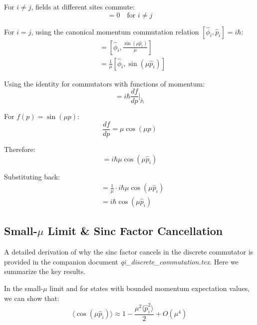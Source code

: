 \documentclass[12pt]{article}
\begin{document}
For $i \neq j$, fields at different sites commute:
\begin{equation}
[\hat{\phi}_i, \hat{\pi}_j^{\text{poly}}] = 0 \quad \text{for } i \neq j
\end{equation}

For $i = j$, using the canonical momentum commutation relation $[\hat{\phi}_i, \hat{p}_i] = i\hbar$:
\begin{align}
[\hat{\phi}_i, \hat{\pi}_i^{\text{poly}}] &= [\hat{\phi}_i, \frac{\sin(\mu \hat{p}_i)}{\mu}] \\
&= \frac{1}{\mu}[\hat{\phi}_i, \sin(\mu \hat{p}_i)]
\end{align}

Using the identity for commutators with functions of momentum:
\begin{equation}
[\hat{\phi}_i, f(\hat{p}_i)] = i\hbar \frac{df}{dp}\bigg|_{\hat{p}_i}
\end{equation}

For $f(p) = \sin(\mu p)$:
\begin{equation}
\frac{df}{dp} = \mu \cos(\mu p)
\end{equation}

Therefore:
\begin{equation}
[\hat{\phi}_i, \sin(\mu \hat{p}_i)] = i\hbar \mu \cos(\mu \hat{p}_i)
\end{equation}

Substituting back:
\begin{align}
[\hat{\phi}_i, \hat{\pi}_i^{\text{poly}}] &= \frac{1}{\mu} \cdot i\hbar \mu \cos(\mu \hat{p}_i) \\
&= i\hbar \cos(\mu \hat{p}_i)
\end{align}

\subsection{Small-$\mu$ Limit \& Sinc Factor Cancellation}

A detailed derivation of why the sinc factor cancels in the discrete commutator is provided in the companion document \textit{qi\_discrete\_commutation.tex}. Here we summarize the key results.

In the small-$\mu$ limit and for states with bounded momentum expectation values, we can show that:
\begin{equation}
\langle \cos(\mu \hat{p}_i) \rangle \approx 1 - \frac{\mu^2 \langle \hat{p}_i^2 \rangle}{2} + O(\mu^4)
\end{equation}
\end{document}
